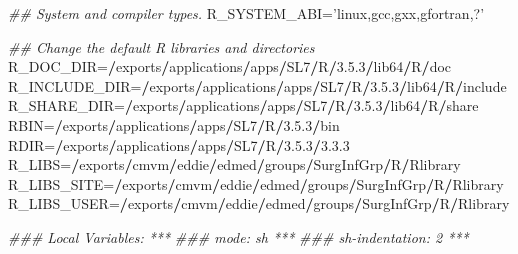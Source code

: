 \documentclass[]{book}
\newenvironment{Shaded}{\begin{snugshade}}{\end{snugshade}}
\newcommand{\CommentTok}[1]{\textcolor[rgb]{0.56,0.35,0.01}{\textit{#1}}}
\newcommand{\DecValTok}[1]{\textcolor[rgb]{0.00,0.00,0.81}{#1}}
\newcommand{\ErrorTok}[1]{\textcolor[rgb]{0.64,0.00,0.00}{\textbf{#1}}}
\newcommand{\FloatTok}[1]{\textcolor[rgb]{0.00,0.00,0.81}{#1}}
\newcommand{\NormalTok}[1]{#1}
\newcommand{\OperatorTok}[1]{\textcolor[rgb]{0.81,0.36,0.00}{\textbf{#1}}}
\newcommand{\StringTok}[1]{\textcolor[rgb]{0.31,0.60,0.02}{#1}}
\begin{document}
\begin{Shaded}
\begin{Highlighting}[]
\CommentTok{## System and compiler types.}
\NormalTok{R_SYSTEM_ABI=}\StringTok{'linux,gcc,gxx,gfortran,?'}


\CommentTok{## Change the default R libraries and directories}
\NormalTok{R_DOC_DIR=}\ErrorTok{/}\NormalTok{exports}\OperatorTok{/}\NormalTok{applications}\OperatorTok{/}\NormalTok{apps}\OperatorTok{/}\NormalTok{SL7}\OperatorTok{/}\NormalTok{R}\OperatorTok{/}\DecValTok{3}\NormalTok{.}\FloatTok{5.3}\OperatorTok{/}\NormalTok{lib64}\OperatorTok{/}\NormalTok{R}\OperatorTok{/}\NormalTok{doc}
\NormalTok{R_INCLUDE_DIR=}\ErrorTok{/}\NormalTok{exports}\OperatorTok{/}\NormalTok{applications}\OperatorTok{/}\NormalTok{apps}\OperatorTok{/}\NormalTok{SL7}\OperatorTok{/}\NormalTok{R}\OperatorTok{/}\DecValTok{3}\NormalTok{.}\FloatTok{5.3}\OperatorTok{/}\NormalTok{lib64}\OperatorTok{/}\NormalTok{R}\OperatorTok{/}\NormalTok{include}
\NormalTok{R_SHARE_DIR=}\ErrorTok{/}\NormalTok{exports}\OperatorTok{/}\NormalTok{applications}\OperatorTok{/}\NormalTok{apps}\OperatorTok{/}\NormalTok{SL7}\OperatorTok{/}\NormalTok{R}\OperatorTok{/}\DecValTok{3}\NormalTok{.}\FloatTok{5.3}\OperatorTok{/}\NormalTok{lib64}\OperatorTok{/}\NormalTok{R}\OperatorTok{/}\NormalTok{share}
\NormalTok{RBIN=}\ErrorTok{/}\NormalTok{exports}\OperatorTok{/}\NormalTok{applications}\OperatorTok{/}\NormalTok{apps}\OperatorTok{/}\NormalTok{SL7}\OperatorTok{/}\NormalTok{R}\OperatorTok{/}\DecValTok{3}\NormalTok{.}\FloatTok{5.3}\OperatorTok{/}\NormalTok{bin}
\NormalTok{RDIR=}\ErrorTok{/}\NormalTok{exports}\OperatorTok{/}\NormalTok{applications}\OperatorTok{/}\NormalTok{apps}\OperatorTok{/}\NormalTok{SL7}\OperatorTok{/}\NormalTok{R}\OperatorTok{/}\DecValTok{3}\NormalTok{.}\FloatTok{5.3}\OperatorTok{/}\DecValTok{3}\NormalTok{.}\FloatTok{3.3}
\NormalTok{R_LIBS=}\ErrorTok{/}\NormalTok{exports}\OperatorTok{/}\NormalTok{cmvm}\OperatorTok{/}\NormalTok{eddie}\OperatorTok{/}\NormalTok{edmed}\OperatorTok{/}\NormalTok{groups}\OperatorTok{/}\NormalTok{SurgInfGrp}\OperatorTok{/}\NormalTok{R}\OperatorTok{/}\NormalTok{Rlibrary}
\NormalTok{R_LIBS_SITE=}\ErrorTok{/}\NormalTok{exports}\OperatorTok{/}\NormalTok{cmvm}\OperatorTok{/}\NormalTok{eddie}\OperatorTok{/}\NormalTok{edmed}\OperatorTok{/}\NormalTok{groups}\OperatorTok{/}\NormalTok{SurgInfGrp}\OperatorTok{/}\NormalTok{R}\OperatorTok{/}\NormalTok{Rlibrary}
\NormalTok{R_LIBS_USER=}\ErrorTok{/}\NormalTok{exports}\OperatorTok{/}\NormalTok{cmvm}\OperatorTok{/}\NormalTok{eddie}\OperatorTok{/}\NormalTok{edmed}\OperatorTok{/}\NormalTok{groups}\OperatorTok{/}\NormalTok{SurgInfGrp}\OperatorTok{/}\NormalTok{R}\OperatorTok{/}\NormalTok{Rlibrary}




\CommentTok{### Local Variables: ***}
\CommentTok{### mode: sh ***}
\CommentTok{### sh-indentation: 2 ***}
\end{Highlighting}
\end{Shaded}
\end{document}
